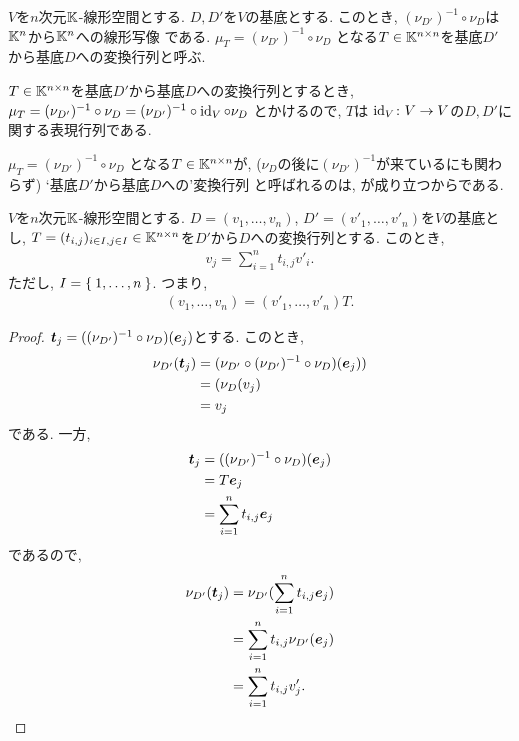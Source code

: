 \begin{definition}
  $V$を$n$次元$\mathbb{K}$-線形空間とする.
  $D,D'$を$V$の基底とする.
  このとき, $(\nu_{D'})^{-1}\circ\nu_{D}$は$\mathbb{K}^n$から$\mathbb{K}^n$への線形写像
  である.
  $\mu_T=(\nu_{D'})^{-1}\circ\nu_{D}$
  となる$T\in\mathbb{K}^{n\times n}$を基底$D'$から基底$D$への変換行列と呼ぶ.
\end{definition}
\begin{remark}
  $T\in\mathbb{K}^{n\times n}$を基底$D'$から基底$D$への変換行列とするとき,
  $\mu_T=(\nu_{D'})^{-1}\circ\nu_{D}=(\nu_{D'})^{-1}\circ\operatorname{id}_{V}\circ\nu_{D}$
  とかけるので,
  $T$は
  $\operatorname{id}_{V}\colon V\to V$の$D,D'$に関する表現行列である.
\end{remark}
  $\mu_T=(\nu_{D'})^{-1}\circ\nu_{D}$
となる$T\in\mathbb{K}^{n\times n}$が,
($\nu_{D}$の後に$(\nu_{D'})^{-1}$が来ているにも関わらず)
`基底$D'$から基底$D$への'変換行列
と呼ばれるのは,
が成り立つからである.
\begin{prop}
  \label{thm:trasmat:description}
  $V$を$n$次元$\mathbb{K}$-線形空間とする.
  $D=(v_1,\ldots, v_n)$,
  $D'=(v'_1,\ldots, v'_n)$を$V$の基底とし,
  $T=(t_{i,j})_{i\in I, j\in I}\in\mathbb{K}^{n\times n}$を$D'$から$D$への変換行列とする.
  このとき,
  \begin{align*}
    v_j=\sum_{i=1}^n t_{i,j}v'_i.
  \end{align*}
  ただし, $I=\Set{1,\ldots, n} $.
  つまり,
  \begin{align*}
    (v_1,\ldots, v_n)=(v'_1,\ldots, v'_n)T.
  \end{align*}
\end{prop}
\begin{proof}
  $\boldsymbol{t}_j=((\nu_{D'})^{-1}\circ\nu_{D})(\boldsymbol{e}_j)$とする.
  このとき,
  \begin{align*}
     \nu_{D'}(\boldsymbol{t}_j)
    &=(\nu_{D'}\circ(\nu_{D'})^{-1}\circ\nu_{D})(\boldsymbol{e}_j))\\
    &=(\nu_{D}(v_j)\\
    &=v_j
  \end{align*}
  である.
  一方,
  \begin{align*}
    \boldsymbol{t}_j&=((\nu_{D'})^{-1}\circ\nu_{D})(\boldsymbol{e}_j)\\
    &=T\boldsymbol{e}_j\\
    &=\sum_{i=1}^n t_{i,j}\boldsymbol{e}_j
  \end{align*}
  であるので,
  \begin{align*}
    \nu_{D'}(\boldsymbol{t}_j)
    &=\nu_{D'}(\sum_{i=1}^n t_{i,j}\boldsymbol{e}_j)\\
    &=\sum_{i=1}^n t_{i,j}\nu_{D'}(\boldsymbol{e}_j)\\
    &=\sum_{i=1}^n t_{i,j}v'_j.
  \end{align*}
\end{proof}

